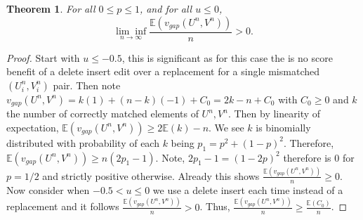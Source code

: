 \documentclass{article}
\newtheorem{theorem}{Theorem}[section]
\begin{document}
\begin{theorem}
For all $0 \leq p \leq 1$, and for all $u \leq 0$,
\begin{equation*}
\underset{n \to \infty}{\lim \inf} \frac{\mathbb{E}(v_{gap}(U^n,V^n))}{n}>0.
\end{equation*}
\end{theorem}

\begin{proof}
Start with $u \leq -0.5$, this is significant as for this case the is no score benefit of a delete insert edit over a replacement for a single mismatched $(U_i^n,V_i^n)$ pair. Then note $v_{gap}(U^n,V^n) =k(1)+(n-k)(-1) +C_0= 2k-n + C_0$ with $C_0 \geq 0$ and $k$ the number of correctly matched elements of $U^n,V^n$. Then by linearity of expectation, $\mathbb{E}(v_{gap}(U^n,V^n)) \geq 2\mathbb{E}(k)-n$. We see $k$ is binomially distributed with probability of each $k$ being $p_1=p^2+(1-p)^2$. Therefore, $\mathbb{E}(v_{gap}(U^n,V^n)) \geq n(2p_1-1)$. Note, $2p_1-1= (1-2p)^2$ therefore is 0 for $p=1/2$ and strictly positive otherwise. Already this shows $\frac{\mathbb{E} (v_{gap}(U^n,V^n))}{n} \geq 0$. Now consider when $-0.5 < u \leq 0$ we use a delete insert each time instead of a replacement and it follows  $\frac{\mathbb{E} (v_{gap}(U^n,V^n))}{n} > 0$. Thus, $\frac{\mathbb{E} (v_{gap}(U^n,V^n))}{n} \geq \frac{\mathbb{E}(C_0)}{n}$.


\end{proof}
\end{document}
